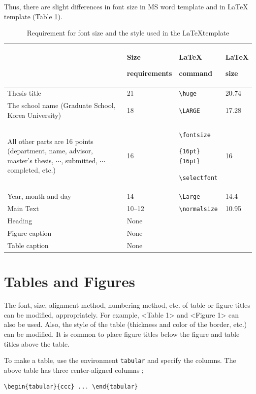 Thus, there are slight differences in font size in MS word template and in \LaTeX ~ template
(Table \ref{tab:font size}). 

\begin{table}
\caption{Requirement for font size and the style used in the \LaTeX template}\label{tab:font size}
\bigskip
\begin{tabular}{>{\centering\arraybackslash}p{5.5cm}p{2.5cm}p{2.5cm}p{1.5cm}}
\toprule
&Size \par requirements & \LaTeX \par command & \LaTeX \par size \\\midrule
Thesis title			&21&\verb|\huge| & 20.74 \\\midrule
The school name (Graduate School, Korea University)
					&18&\verb|\LARGE| & 17.28 \\\midrule
All other parts are 16 points (department, name, advisor, master's thesis, \(\cdots\), submitted, \(\cdots\) completed, etc.)	
					&16&\verb|\fontsize| \par \verb|{16pt}{16pt}| \par \verb|\selectfont|  & 16 \\\midrule

Year, month and day	&14&\verb|\Large| & 14.4  \\\midrule
Main Text			&10--12&\verb|\normalsize| & 10.95 \\\midrule
Heading				&None&\\\midrule
Figure caption			&None&\\\midrule
Table caption			&None&\\\bottomrule
\end{tabular}
\end{table}

\section{Tables and Figures}\label{sec:table_figure}
The font, size, alignment method, numbering method, etc. of table or figure titles can be modified, appropriately. For example, <Table 1> and <Figure 1> can also be used. Also, the style of the table (thickness and color of the border, etc.) can be modified. It is common to place figure titles below the figure and table titles above the table.

To make a table, use the environment \texttt{tabular} and specify the columns.
The above table has three center-aligned columns ;
\begin{verbatim}
\begin{tabular}{ccc} ... \end{tabular}
\end{verbatim}

